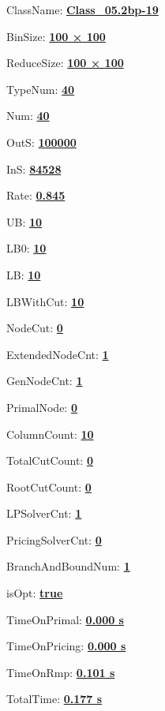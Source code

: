 \documentclass[11pt]{article}
\begin{document}
\pagestyle{empty}


ClassName: \underline{\textbf{Class_05.2bp-19}}
\par
BinSize: \underline{\textbf{100 × 100}}
\par
ReduceSize: \underline{\textbf{100 × 100}}
\par
TypeNum: \underline{\textbf{40}}
\par
Num: \underline{\textbf{40}}
\par
OutS: \underline{\textbf{100000}}
\par
InS: \underline{\textbf{84528}}
\par
Rate: \underline{\textbf{0.845}}
\par
UB: \underline{\textbf{10}}
\par
LB0: \underline{\textbf{10}}
\par
LB: \underline{\textbf{10}}
\par
LBWithCut: \underline{\textbf{10}}
\par
NodeCut: \underline{\textbf{0}}
\par
ExtendedNodeCnt: \underline{\textbf{1}}
\par
GenNodeCnt: \underline{\textbf{1}}
\par
PrimalNode: \underline{\textbf{0}}
\par
ColumnCount: \underline{\textbf{10}}
\par
TotalCutCount: \underline{\textbf{0}}
\par
RootCutCount: \underline{\textbf{0}}
\par
LPSolverCnt: \underline{\textbf{1}}
\par
PricingSolverCnt: \underline{\textbf{0}}
\par
BranchAndBoundNum: \underline{\textbf{1}}
\par
isOpt: \underline{\textbf{true}}
\par
TimeOnPrimal: \underline{\textbf{0.000 s}}
\par
TimeOnPricing: \underline{\textbf{0.000 s}}
\par
TimeOnRmp: \underline{\textbf{0.101 s}}
\par
TotalTime: \underline{\textbf{0.177 s}}
\par
\newpage


\end{document}
